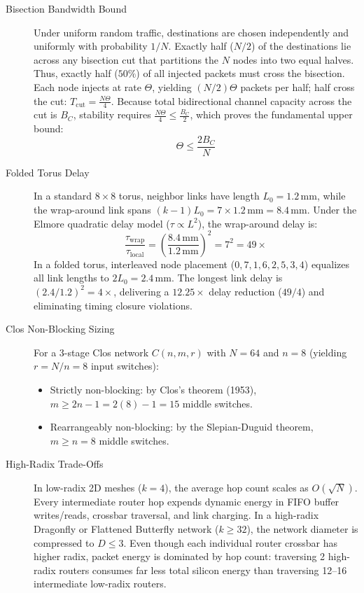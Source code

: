 \begin{description}
    \item[Bisection Bandwidth Bound] Under uniform random traffic, destinations are chosen independently and uniformly with probability $1/N$. Exactly half ($N/2$) of the destinations lie across any bisection cut that partitions the $N$ nodes into two equal halves. Thus, exactly half ($50\%$) of all injected packets must cross the bisection. Each node injects at rate $\Theta$, yielding $(N/2)\Theta$ packets per half; half cross the cut: $T_{\mathrm{cut}} = \frac{N \Theta}{4}$. Because total bidirectional channel capacity across the cut is $B_C$, stability requires $\frac{N \Theta}{4} \le \frac{B_C}{2}$, which proves the fundamental upper bound:
    \begin{equation*}
    \Theta \le \frac{2 B_C}{N}
    \end{equation*}

    \item[Folded Torus Delay] In a standard $8 \times 8$ torus, neighbor links have length $L_0 = 1.2\,\mathrm{mm}$, while the wrap-around link spans $(k-1) L_0 = 7 \times 1.2\,\mathrm{mm} = 8.4\,\mathrm{mm}$. Under the Elmore quadratic delay model ($\tau \propto L^2$), the wrap-around delay is:
    \begin{equation*}
    \frac{\tau_{\mathrm{wrap}}}{\tau_{\mathrm{local}}} = \left(\frac{8.4\,\mathrm{mm}}{1.2\,\mathrm{mm}}\right)^2 = 7^2 = 49\times
    \end{equation*}
    In a folded torus, interleaved node placement ($0, 7, 1, 6, 2, 5, 3, 4$) equalizes all link lengths to $2 L_0 = 2.4\,\mathrm{mm}$. The longest link delay is $(2.4/1.2)^2 = 4\times$, delivering a $12.25\times$ delay reduction ($49/4$) and eliminating timing closure violations.

    \item[Clos Non-Blocking Sizing] For a 3-stage Clos network $C(n, m, r)$ with $N = 64$ and $n = 8$ (yielding $r = N/n = 8$ input switches):
    \begin{itemize}
        \item Strictly non-blocking: by Clos's theorem (1953), $m \ge 2n - 1 = 2(8) - 1 = 15$ middle switches.
        \item Rearrangeably non-blocking: by the Slepian-Duguid theorem, $m \ge n = 8$ middle switches.
    \end{itemize}

    \item[High-Radix Trade-Offs] In low-radix 2D meshes ($k = 4$), the average hop count scales as $O(\sqrt{N})$. Every intermediate router hop expends dynamic energy in FIFO buffer writes/reads, crossbar traversal, and link charging. In a high-radix Dragonfly or Flattened Butterfly network ($k \ge 32$), the network diameter is compressed to $D \le 3$. Even though each individual router crossbar has higher radix, packet energy is dominated by hop count: traversing 2 high-radix routers consumes far less total silicon energy than traversing 12--16 intermediate low-radix routers.
\end{description}

